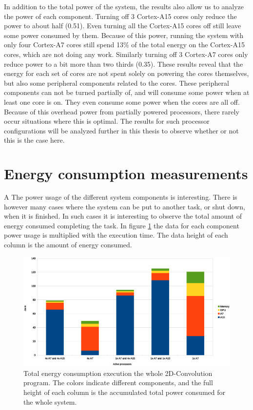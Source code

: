 In addition to the total power of the system, the results also allow us to analyze the power of each component.
Turning off 3 Cortex-A15 cores only reduce the power to about half (0.51).
Even turning all the Cortex-A15 cores off still leave some power consumed by them.
Because of this power, running the system with only four Cortex-A7 cores still spend 13\% of the total energy on the Cortex-A15 cores, which are not doing any work.
Similarly turning off 3 Cortex-A7 cores only reduce power to a bit more than two thirds (0.35).
These results reveal that the energy for each set of cores are not spent solely on powering the cores themselves, but also some peripheral components related to the cores.
These peripheral components can not be turned partially of, and will consume some power when at least one core is on.
They even consume some power when the cores are all off.
Because of this overhead power from partially powered processors, there rarely occur situations where this is optimal.
The results for such processor configurations will be analyzed further in this thesis to observe whether or not this is the case here.
\section{Energy consumption measurements}A \label{energyconsumptionmeasurements}
The power usage of the different system components is interesting.
There is however many cases where the system can be put to another task, or shut down, when it is finished.
In such cases it is interesting to observe the total amount of energy consumed completing the task.
In figure \ref{power-consumed-configurations} the data for each component power usage is multiplied with the execution time.
The data height of each column is the amount of energy consumed.

\begin{figure}[H]
  \centering
  \includegraphics[width=160mm]{fig/power-consumed-configurations.eps}
  \caption{Total energy consumption execution the whole 2D-Convolution program. The colors indicate different components, and the full height of each column is the accumulated total power consumed for the whole system.\label{overflow}} \label {power-consumed-configurations}
\end{figure}

